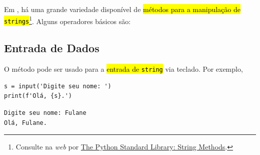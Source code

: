 Em {\python}, há uma grande variedade disponível de \hl{métodos para a manipulação de \texttt{strings}}\footnote{Consulte na \textit{web} por \href{https://docs.python.org/3/library/stdtypes.html\#string-methods}{The Python Standard Library: String Methods}.}. Alguns operadores básicos são:

\subsection{Entrada de Dados}

O método {\PYTHONinput} pode ser usado para a \hl{entrada de \texttt{string}} via teclado. Por exemplo,

\begin{lstlisting}
s = input('Digite seu nome: ')
print(f'Olá, {s}.')
\end{lstlisting}

\begin{verbatim}
Digite seu nome: Fulane
Olá, Fulane.
\end{verbatim}

